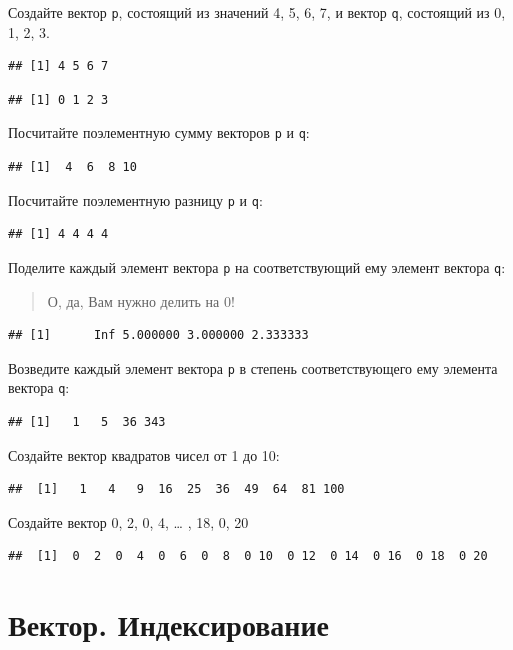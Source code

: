 \documentclass[]{book}
\begin{document}
Создайте вектор \texttt{p}, состоящий из значений 4, 5, 6, 7, и вектор \texttt{q}, состоящий из 0, 1, 2, 3.

\begin{verbatim}
## [1] 4 5 6 7
\end{verbatim}

\begin{verbatim}
## [1] 0 1 2 3
\end{verbatim}

Посчитайте поэлементную сумму векторов \texttt{p} и \texttt{q}:

\begin{verbatim}
## [1]  4  6  8 10
\end{verbatim}

Посчитайте поэлементную разницу \texttt{p} и \texttt{q}:

\begin{verbatim}
## [1] 4 4 4 4
\end{verbatim}

Поделите каждый элемент вектора \texttt{p} на соответствующий ему элемент вектора \texttt{q}:

\begin{quote}
О, да, Вам нужно делить на 0!
\end{quote}

\begin{verbatim}
## [1]      Inf 5.000000 3.000000 2.333333
\end{verbatim}

Возведите каждый элемент вектора \texttt{p} в степень соответствующего ему элемента вектора \texttt{q}:

\begin{verbatim}
## [1]   1   5  36 343
\end{verbatim}

Создайте вектор квадратов чисел от 1 до 10:

\begin{verbatim}
##  [1]   1   4   9  16  25  36  49  64  81 100
\end{verbatim}

Создайте вектор 0, 2, 0, 4, \ldots{} , 18, 0, 20

\begin{verbatim}
##  [1]  0  2  0  4  0  6  0  8  0 10  0 12  0 14  0 16  0 18  0 20
\end{verbatim}

\hypertarget{vec_task_2}{%
\section{Вектор. Индексирование}\label{vec_task_2}}
\end{document}
